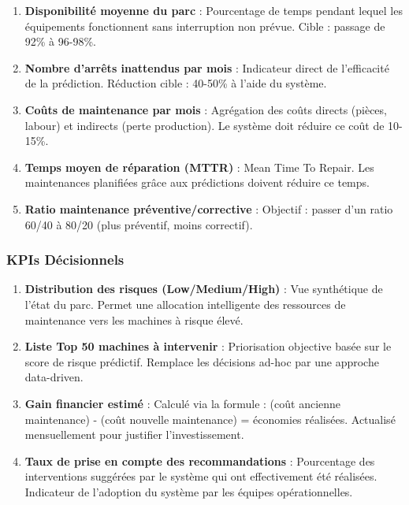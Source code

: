 \documentclass[a4paper,12pt,twoside]{report}
\begin{document}
\begin{enumerate}
    \item \textbf{Disponibilité moyenne du parc} : Pourcentage de temps pendant lequel les équipements fonctionnent sans interruption non prévue. Cible : passage de 92\% à 96-98\%.
    
    \item \textbf{Nombre d'arrêts inattendus par mois} : Indicateur direct de l'efficacité de la prédiction. Réduction cible : 40-50\% à l'aide du système.
    
    \item \textbf{Coûts de maintenance par mois} : Agrégation des coûts directs (pièces, labour) et indirects (perte production). Le système doit réduire ce coût de 10-15\%.
    
    \item \textbf{Temps moyen de réparation (MTTR)} : Mean Time To Repair. Les maintenances planifiées grâce aux prédictions doivent réduire ce temps.
    
    \item \textbf{Ratio maintenance préventive/corrective} : Objectif : passer d'un ratio 60/40 à 80/20 (plus préventif, moins correctif).
\end{enumerate}

\subsubsection{KPIs Décisionnels}

\begin{enumerate}
    \item \textbf{Distribution des risques (Low/Medium/High)} : Vue synthétique de l'état du parc. Permet une allocation intelligente des ressources de maintenance vers les machines à risque élevé.
    
    \item \textbf{Liste Top 50 machines à intervenir} : Priorisation objective basée sur le score de risque prédictif. Remplace les décisions ad-hoc par une approche data-driven.
    
    \item \textbf{Gain financier estimé} : Calculé via la formule : (coût ancienne maintenance) - (coût nouvelle maintenance) = économies réalisées. Actualisé mensuellement pour justifier l'investissement.
    
    \item \textbf{Taux de prise en compte des recommandations} : Pourcentage des interventions suggérées par le système qui ont effectivement été réalisées. Indicateur de l'adoption du système par les équipes opérationnelles.
\end{enumerate}
\end{document}

